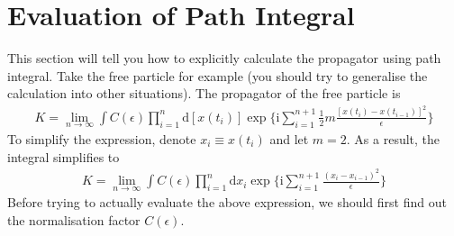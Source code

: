 \documentclass[letterpaper,10pt,english]{sphinxmanual}
\begin{document}
\section{Evaluation of Path Integral}
\label{\detokenize{pi_eval:evaluation-of-path-integral}}\label{\detokenize{pi_eval::doc}}
This section will tell you how to explicitly calculate the propagator using path integral. Take the free particle for example (you should try to generalise the calculation into other situations). The propagator of the free particle is
\begin{equation*}
\begin{split}K = \lim_{n\rightarrow\infty}\int C(\epsilon)\prod_{i=1}^{n}\mathrm{d}[x(t_i)]\exp\{\mathrm{i}\sum_{i=1}^{n+1}\frac{1}{2}m\frac{[x(t_i)-x(t_{i-1})]^2}{\epsilon}\}\end{split}
\end{equation*}
To simplify the expression, denote \(x_i\equiv x(t_i)\) and let \(m=2\). As a result, the integral simplifies to
\begin{equation*}
\begin{split}K = \lim_{n\rightarrow\infty}\int C(\epsilon)\prod_{i=1}^{n}\mathrm{d}x_i\exp\{\mathrm{i}\sum_{i=1}^{n+1}\frac{(x_i-x_{i-1})^2}{\epsilon}\}\end{split}
\end{equation*}
Before trying to actually evaluate the above expression, we should first find out the normalisation factor \(C(\epsilon)\).
\end{document}
